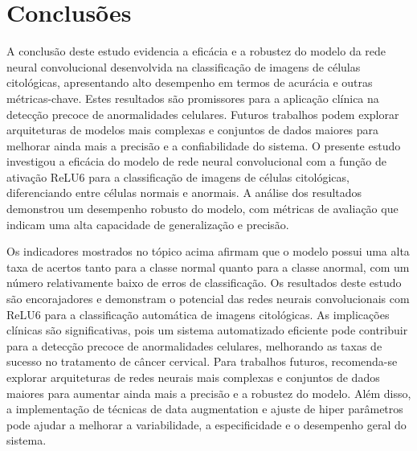 \chapter{Conclusões}\label{chapter:conclusoes}

A conclusão deste estudo evidencia a eficácia e a robustez do modelo da rede neural convolucional desenvolvida na classificação de imagens de células citológicas, apresentando alto desempenho em termos de acurácia e outras métricas-chave. Estes resultados são promissores para a aplicação clínica na detecção precoce de anormalidades celulares. Futuros trabalhos podem explorar arquiteturas de modelos mais complexas e conjuntos de dados maiores para melhorar ainda mais a precisão e a confiabilidade do sistema. O presente estudo investigou a eficácia do modelo de rede neural convolucional com a função de ativação ReLU6 para a classificação de imagens de células citológicas, diferenciando entre células normais e anormais. A análise dos resultados demonstrou um desempenho robusto do modelo, com métricas de avaliação que indicam uma alta capacidade de generalização e precisão.

Os indicadores mostrados no tópico acima afirmam que o modelo possui uma alta taxa de acertos tanto para a classe normal quanto para a classe anormal, com um número relativamente baixo de erros de classificação. Os resultados deste estudo são encorajadores e demonstram o potencial das redes neurais convolucionais com ReLU6 para a classificação automática de imagens citológicas. As implicações clínicas são significativas, pois um sistema automatizado eficiente pode contribuir para a detecção precoce de anormalidades celulares, melhorando as taxas de sucesso no tratamento de câncer cervical. Para trabalhos futuros, recomenda-se explorar arquiteturas de redes neurais mais complexas e conjuntos de dados maiores para aumentar ainda mais a precisão e a robustez do modelo. Além disso, a implementação de técnicas de data augmentation e ajuste de hiper parâmetros pode ajudar a melhorar a variabilidade, a especificidade e o desempenho geral do sistema.